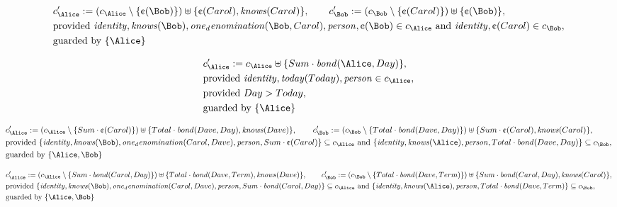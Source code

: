 \begin{align*}
&
c'_
{
\Alice
}
 := 
(c_
{
\Alice
}
 \setminus 
\{
\text{\textcent}
(
\Bob
)
\}
) \uplus 
\{
\text{\textcent}
(
Carol
)
,
\mathit{
knows
}
(
Carol
)
\}
, \qquad 
c'_
{
\Bob
}
 := 
(c_
{
\Bob
}
 \setminus 
\{
\text{\textcent}
(
Carol
)
\}
) \uplus 
\{
\text{\textcent}
(
\Bob
)
\}
,\\
&
\text{provided } 
\mathit{
identity
}
,
\mathit{
knows
}
(
\Bob
)
,
\mathit{
one_denomination
}
(
\Bob
,
Carol
)
,
\mathit{
person
}
,
\text{\textcent}
(
\Bob
)
 \in c_
{
\Alice
}
 \text{ and } 
\mathit{
identity
}
,
\text{\textcent}
(
Carol
)
 \in c_
{
\Bob
}
,\\
&
\text{guarded by } \{
\Alice
\}
\end{align*}

\begin{align*}
&
c'_
{
\Alice
}
 := 
c_
{
\Alice
}
 \uplus 
\{
Sum
\cdot
\mathit{
bond
}
(
\Alice
,
Day
)
\}
,\\
&
\text{provided } 
\mathit{
identity
}
,
\mathit{
today
}
(
Today
)
,
\mathit{
person
}
 \in c_
{
\Alice
}
,\\
&
\text{provided } 
Day
>
Today
,\\
&
\text{guarded by } \{
\Alice
\}
\end{align*}

\begin{align*}
&
c'_
{
\Alice
}
 := 
(c_
{
\Alice
}
 \setminus 
\{
Sum
\cdot
\text{\textcent}
(
Carol
)
\}
) \uplus 
\{
Total
\cdot
\mathit{
bond
}
(
Dave
,
Day
)
,
\mathit{
knows
}
(
Dave
)
\}
, \qquad 
c'_
{
\Bob
}
 := 
(c_
{
\Bob
}
 \setminus 
\{
Total
\cdot
\mathit{
bond
}
(
Dave
,
Day
)
\}
) \uplus 
\{
Sum
\cdot
\text{\textcent}
(
Carol
)
,
\mathit{
knows
}
(
Carol
)
\}
,\\
&
\text{provided } 
\{
\mathit{
identity
}
,
\mathit{
knows
}
(
\Bob
)
,
\mathit{
one_denomination
}
(
Carol
,
Dave
)
,
\mathit{
person
}
,
Sum
\cdot
\text{\textcent}
(
Carol
)
\}
 \subseteq c_
{
\Alice
}
 \text{ and } 
\{
\mathit{
identity
}
,
\mathit{
knows
}
(
\Alice
)
,
\mathit{
person
}
,
Total
\cdot
\mathit{
bond
}
(
Dave
,
Day
)
\}
 \subseteq c_
{
\Bob
}
,\\
&
\text{guarded by } \{
\Alice
,
\Bob
\}
\end{align*}

\begin{align*}
&
c'_
{
\Alice
}
 := 
(c_
{
\Alice
}
 \setminus 
\{
Sum
\cdot
\mathit{
bond
}
(
Carol
,
Day
)
\}
) \uplus 
\{
Total
\cdot
\mathit{
bond
}
(
Dave
,
Term
)
,
\mathit{
knows
}
(
Dave
)
\}
, \qquad 
c'_
{
\Bob
}
 := 
(c_
{
\Bob
}
 \setminus 
\{
Total
\cdot
\mathit{
bond
}
(
Dave
,
Term
)
\}
) \uplus 
\{
Sum
\cdot
\mathit{
bond
}
(
Carol
,
Day
)
,
\mathit{
knows
}
(
Carol
)
\}
,\\
&
\text{provided } 
\{
\mathit{
identity
}
,
\mathit{
knows
}
(
\Bob
)
,
\mathit{
one_denomination
}
(
Carol
,
Dave
)
,
\mathit{
person
}
,
Sum
\cdot
\mathit{
bond
}
(
Carol
,
Day
)
\}
 \subseteq c_
{
\Alice
}
 \text{ and } 
\{
\mathit{
identity
}
,
\mathit{
knows
}
(
\Alice
)
,
\mathit{
person
}
,
Total
\cdot
\mathit{
bond
}
(
Dave
,
Term
)
\}
 \subseteq c_
{
\Bob
}
,\\
&
\text{guarded by } \{
\Alice
,
\Bob
\}
\end{align*}
